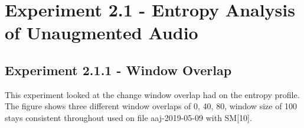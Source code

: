 \section{Experiment 2.1 - Entropy Analysis of Unaugmented Audio}
%

\subsection{Experiment 2.1.1 - Window Overlap}
This experiment looked at the change window overlap had on the entropy profile. The figure shows three different window overlaps of 0, 40, 80, window size of 100 stays consistent throughout used on file aaj-2019-05-09 with SM[10].


